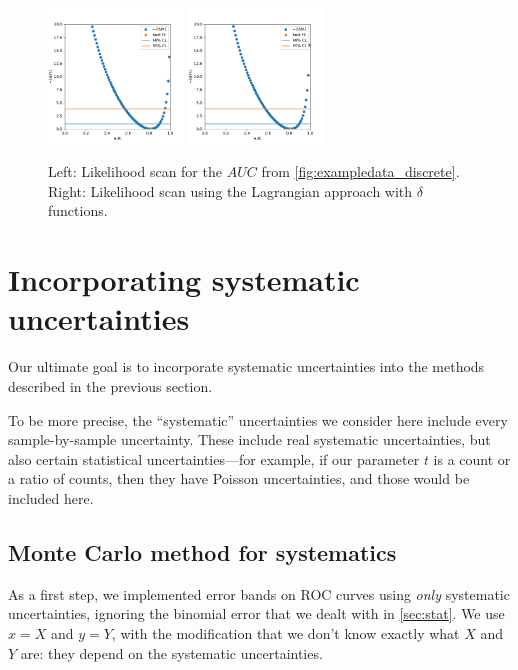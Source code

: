 \documentclass[11pt]{article}
\newcommand{\AUC}{AUC}
\begin{document}
\begin{figure}
\begin{center}
\includegraphics[width=0.32\textwidth]{discrete_scan.pdf}
\includegraphics[width=0.32\textwidth]{delta_functions_scan_compare_to_discrete.pdf}
\caption{Left: Likelihood scan for the \(\AUC\) from \cref{fig:exampledata_discrete}.  Right: Likelihood scan using the Lagrangian approach with \(\delta\) functions.}
\label{fig:exampledata_delta_functions_disagreement}
\end{center}
\end{figure}

\section{Incorporating systematic uncertainties}

Our ultimate goal is to incorporate systematic uncertainties into the methods described in the previous section.

To be more precise, the ``systematic'' uncertainties we consider here include every sample-by-sample uncertainty.  These include real systematic uncertainties, but also certain statistical uncertainties---for example, if our parameter \(t\) is a count or a ratio of counts, then they have Poisson uncertainties, and those would be included here.

\subsection{Monte Carlo method for systematics}

As a first step, we implemented error bands on ROC curves using \emph{only} systematic uncertainties, ignoring the binomial error that we dealt with in \cref{sec:stat}.  We use \(x=X\) and \(y=Y\), with the modification that we don't know exactly what \(X\) and \(Y\) are: they depend on the systematic uncertainties.
\end{document}

